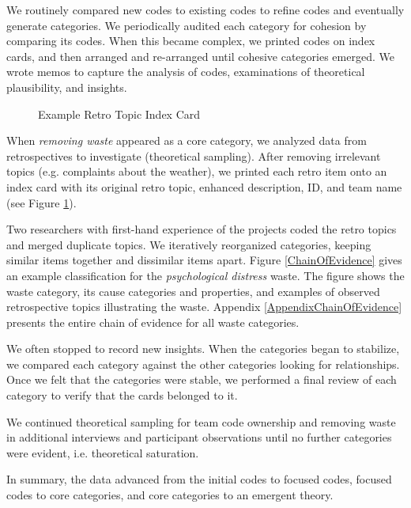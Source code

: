 We routinely compared new codes to existing codes to refine codes and eventually generate categories. We periodically audited each category for cohesion by comparing its codes. When this became complex, we printed codes on index cards, and then arranged and re-arranged until cohesive categories emerged. We wrote memos to capture the analysis of codes, examinations of theoretical plausibility, and insights.

\begin{figure}[t]
\centering
{}
\caption{Example Retro Topic Index Card}
\label{exampleRetroTopicl}
\end{figure}

 When \textit{removing waste} appeared as a core category, we analyzed data from retrospectives to investigate (theoretical sampling). After removing irrelevant topics (e.g. complaints about the weather), we printed each retro item onto an index card with its original retro topic, enhanced description, ID, and team name (see Figure \ref{exampleRetroTopicl}).

Two researchers with first-hand experience of the projects coded the retro topics and merged duplicate topics. We iteratively reorganized categories, keeping similar items together and dissimilar items apart. Figure \ref{ChainOfEvidence} gives an example classification for the \textit{psychological distress} waste. The figure shows the waste category, its cause categories and properties, and examples of observed retrospective topics illustrating the waste.  Appendix \ref{AppendixChainOfEvidence} presents the entire chain of evidence for all waste categories.

We often stopped to record new insights. When the categories began to stabilize, we compared each category against the other categories looking for relationships. Once we felt that the categories were stable, we performed a final review of each category to verify that the cards belonged to it.

We continued theoretical sampling for team code ownership and removing waste in additional interviews and participant observations until no further categories were evident, i.e. theoretical saturation. 

In summary, the data advanced from the initial codes to focused codes, focused codes to core categories, and core categories to an emergent theory. 










